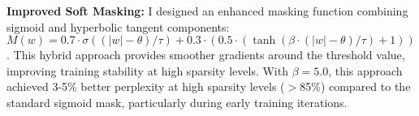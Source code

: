 \documentclass[11pt,letterpaper]{article}
\begin{document}
\textbf{Improved Soft Masking:} I designed an enhanced masking function combining sigmoid and hyperbolic tangent components: $M(w) = 0.7 \cdot \sigma((|w| - \theta) / \tau) + 0.3 \cdot (0.5 \cdot (\tanh(\beta \cdot (|w| - \theta) / \tau) + 1))$. This hybrid approach provides smoother gradients around the threshold value, improving training stability at high sparsity levels. With $\beta=5.0$, this approach achieved 3-5\% better perplexity at high sparsity levels ($>$85\%) compared to the standard sigmoid mask, particularly during early training iterations.
\end{document}
